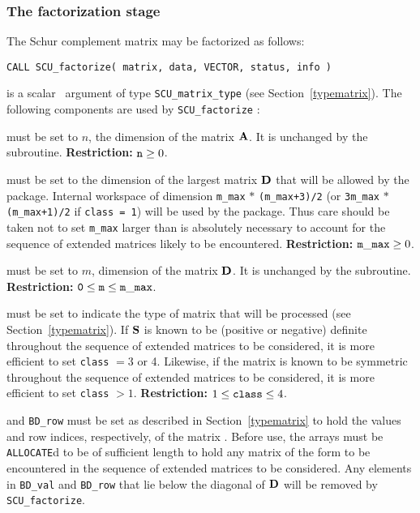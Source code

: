 \documentclass{galahad}
\newcommand{\packagename}{SCU}
\begin{document}


\subsubsection{The factorization stage}
The Schur complement matrix may be factorized as follows:
\vspace*{1mm}

\hskip0.5in 
{\tt CALL \packagename\_factorize( matrix, data, VECTOR, status, info )}

\vspace*{-3mm}
\begin{description}

 is a scalar \intentinout\ argument of type 
{\tt \packagename\_matrix\_type} 
(see Section~\ref{typematrix}). 
The following components are used by {\tt \packagename\_factorize} : 
 
\begin{description} 
 must be set to $n$, the dimension of the matrix $ {\mathbf{A}}$. 
It is unchanged by the subroutine. {\bf Restriction:} ${\tt n} \geq 0$.
 
 must be set to the 
dimension of the largest matrix ${\mathbf{D}}$ that will be allowed 
by the package. Internal workspace of dimension 
{\tt m\_max} $\ast$ {\tt (m\_max+3)/2} 
(or {\tt 3m\_max} $\ast$ {\tt (m\_max+1)/2} if {\tt class = 1}) 
will be used by the package. Thus care should be taken not to set {\tt m\_max} 
larger than is absolutely necessary to account for the sequence of  
extended matrices likely to be encountered. 
{\bf Restriction:} ${\tt m\_max} \geq 0$.
 
 must be set to $m$, dimension of the matrix ${\mathbf{D}}$. 
It is unchanged by the subroutine. 
{\bf Restriction:} ${\tt 0} \leq {\tt m} \leq {\tt m\_max}$.
 
 must be set to indicate the type of matrix that will be
processed (see Section~\ref{typematrix}). 
If ${\mathbf{S}}$ is known 
to be (positive or negative) definite throughout the sequence 
of extended matrices to be considered, it is more efficient to set 
{\tt class} $= 3$ or 4. Likewise, if the matrix is known 
to be symmetric throughout the sequence 
of extended matrices to be considered, it is more efficient to set 
{\tt class} $> 1$.  
{\bf Restriction:} $1 \leq  {\tt class} \leq 4$. 
 
 and {\tt BD\_row} must be set as described in 
Section~\ref{typematrix}  to hold the values and row indices, respectively, 
of the matrix .  Before use, the arrays must be {\tt ALLOCATE}d 
to be of sufficient length to hold any matrix of the form  
to be encountered in the sequence of 
extended matrices to be considered. Any elements in {\tt BD\_val} and 
{\tt BD\_row} 
that lie below the diagonal of ${\mathbf{D}}$ will be removed by 
{\tt \packagename\_factorize}. 
 

\end{description}
\end{description}
\end{document}
